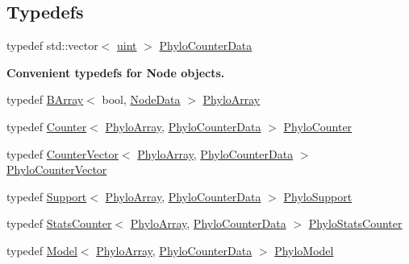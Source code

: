 \subsection*{Typedefs}
\begin{DoxyCompactItemize}
\item 
typedef std\+::vector$<$ \hyperlink{namespacebarry_a11dfc53ddb4672278319aa04f1e09a6c}{uint} $>$ \hyperlink{namespacebarry_1_1counters_1_1phylo_a6ecc0d8ab76f8dc2db152221a8e9e95a}{Phylo\+Counter\+Data}
\end{DoxyCompactItemize}
\begin{Indent}\textbf{ Convenient typedefs for Node objects.}\par
\begin{DoxyCompactItemize}
\item 
typedef \hyperlink{classbarry_1_1_b_array}{B\+Array}$<$ bool, \hyperlink{classbarry_1_1counters_1_1phylo_1_1_node_data}{Node\+Data} $>$ \hyperlink{namespacebarry_1_1counters_1_1phylo_a50a6652c16ff57d76b4099043d6a0bbb}{Phylo\+Array}
\item 
typedef \hyperlink{classbarry_1_1_counter}{Counter}$<$ \hyperlink{namespacebarry_1_1counters_1_1phylo_a50a6652c16ff57d76b4099043d6a0bbb}{Phylo\+Array}, \hyperlink{namespacebarry_1_1counters_1_1phylo_a6ecc0d8ab76f8dc2db152221a8e9e95a}{Phylo\+Counter\+Data} $>$ \hyperlink{namespacebarry_1_1counters_1_1phylo_a6523924ce3465c5b212584c57664f953}{Phylo\+Counter}
\item 
typedef \hyperlink{classbarry_1_1_counter_vector}{Counter\+Vector}$<$ \hyperlink{namespacebarry_1_1counters_1_1phylo_a50a6652c16ff57d76b4099043d6a0bbb}{Phylo\+Array}, \hyperlink{namespacebarry_1_1counters_1_1phylo_a6ecc0d8ab76f8dc2db152221a8e9e95a}{Phylo\+Counter\+Data} $>$ \hyperlink{namespacebarry_1_1counters_1_1phylo_a2f117d1cd1dff67e1539cbc0aef5766a}{Phylo\+Counter\+Vector}
\item 
typedef \hyperlink{classbarry_1_1_support}{Support}$<$ \hyperlink{namespacebarry_1_1counters_1_1phylo_a50a6652c16ff57d76b4099043d6a0bbb}{Phylo\+Array}, \hyperlink{namespacebarry_1_1counters_1_1phylo_a6ecc0d8ab76f8dc2db152221a8e9e95a}{Phylo\+Counter\+Data} $>$ \hyperlink{namespacebarry_1_1counters_1_1phylo_a40ee9e679f0f95fdeeb18cd0a2e45d48}{Phylo\+Support}
\item 
typedef \hyperlink{classbarry_1_1_stats_counter}{Stats\+Counter}$<$ \hyperlink{namespacebarry_1_1counters_1_1phylo_a50a6652c16ff57d76b4099043d6a0bbb}{Phylo\+Array}, \hyperlink{namespacebarry_1_1counters_1_1phylo_a6ecc0d8ab76f8dc2db152221a8e9e95a}{Phylo\+Counter\+Data} $>$ \hyperlink{namespacebarry_1_1counters_1_1phylo_abfefb6cff81a19d278b306a79cc011a3}{Phylo\+Stats\+Counter}
\item 
typedef \hyperlink{classbarry_1_1_model}{Model}$<$ \hyperlink{namespacebarry_1_1counters_1_1phylo_a50a6652c16ff57d76b4099043d6a0bbb}{Phylo\+Array}, \hyperlink{namespacebarry_1_1counters_1_1phylo_a6ecc0d8ab76f8dc2db152221a8e9e95a}{Phylo\+Counter\+Data} $>$ \hyperlink{namespacebarry_1_1counters_1_1phylo_ad444f866521f3b4fc617c5fffe16b1d8}{Phylo\+Model}
\end{DoxyCompactItemize}
\end{Indent}
